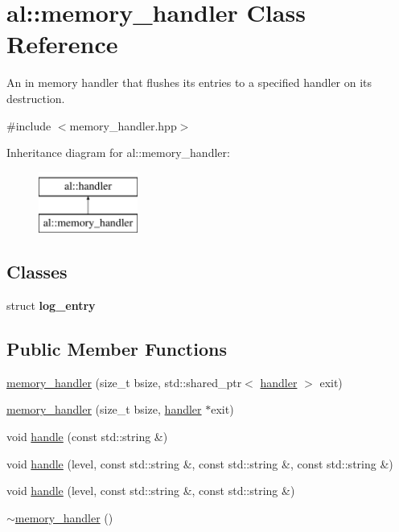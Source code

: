 \hypertarget{classal_1_1memory__handler}{\section{al\-:\-:memory\-\_\-handler \-Class \-Reference}
\label{classal_1_1memory__handler}
}


\-An in memory handler that flushes its entries to a specified handler on its destruction.  




{\ttfamily \#include $<$memory\-\_\-handler.\-hpp$>$}

\-Inheritance diagram for al\-:\-:memory\-\_\-handler\-:\begin{figure}[H]
\begin{center}
\leavevmode
\includegraphics[height=2.000000cm]{classal_1_1memory__handler}
\end{center}
\end{figure}
\subsection*{\-Classes}
\begin{DoxyCompactItemize}
\item 
struct {\bfseries log\-\_\-entry}
\end{DoxyCompactItemize}
\subsection*{\-Public \-Member \-Functions}
\begin{DoxyCompactItemize}
\item 
\hyperlink{classal_1_1memory__handler_a74331eb896c73e46e9d8da1ab8443b32}{memory\-\_\-handler} (size\-\_\-t bsize, std\-::shared\-\_\-ptr$<$ \hyperlink{classal_1_1handler}{handler} $>$ exit)
\item 
\hyperlink{classal_1_1memory__handler_a9fb2ab334acd0702992e2457c4098b77}{memory\-\_\-handler} (size\-\_\-t bsize, \hyperlink{classal_1_1handler}{handler} $\ast$exit)
\item 
void \hyperlink{classal_1_1memory__handler_a6e8ccdb9752f787cedd61576c8758298}{handle} (const std\-::string \&)
\item 
void \hyperlink{classal_1_1memory__handler_a5d2bda991fb466cf804fbd0646f21eea}{handle} (level, const std\-::string \&, const std\-::string \&, const std\-::string \&)
\item 
void \hyperlink{classal_1_1memory__handler_ac7d78c5cee952f2934b12e26f4f271eb}{handle} (level, const std\-::string \&, const std\-::string \&)
\item 
\hyperlink{classal_1_1memory__handler_a09887d99cbdaea2db862a92b9d1edd7c}{$\sim$memory\-\_\-handler} ()
\end{DoxyCompactItemize}


